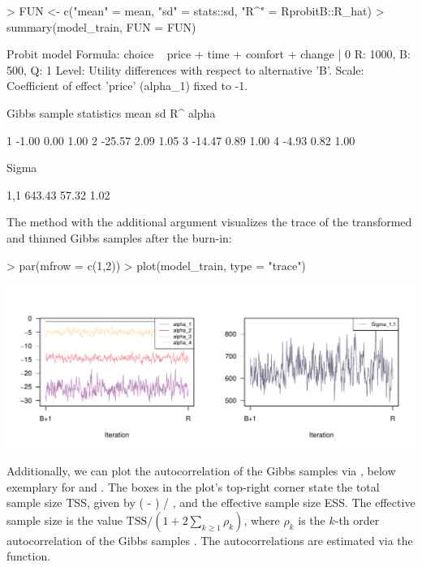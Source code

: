 \documentclass[article,shortnames]{jss}
\newcommand{\fct}[1]{\code{#1()}}
\begin{document}
\begin{Schunk}
\begin{Sinput}
> FUN <- c("mean" = mean, "sd" = stats::sd, "R^" = RprobitB::R_hat)
> summary(model_train, FUN = FUN)
\end{Sinput}
\begin{Soutput}
Probit model
Formula: choice ~ price + time + comfort + change | 0 
R: 1000, B: 500, Q: 1
Level: Utility differences with respect to alternative 'B'.
Scale: Coefficient of effect 'price' (alpha_1) fixed to -1.

Gibbs sample statistics
          mean      sd      R^
 alpha
                              
     1   -1.00    0.00    1.00
     2  -25.57    2.09    1.05
     3  -14.47    0.89    1.00
     4   -4.93    0.82    1.00

 Sigma
                              
   1,1  643.43   57.32    1.02
\end{Soutput}
\end{Schunk}

The \fct{plot} method with the additional argument  visualizes the trace of the transformed and thinned Gibbs samples after the burn-in:

\begin{Schunk}
\begin{Sinput}
> par(mfrow = c(1,2))
> plot(model_train, type = "trace")
\end{Sinput}
\end{Schunk}
\includegraphics{rprobitb_oelschlaeger_bauer-model-train-trace}

Additionally, we can plot the autocorrelation of the Gibbs samples via , below exemplary for  and . The boxes in the plot's top-right corner state the total sample size TSS, given by ( - ) / , and the effective sample size ESS. The effective sample size is the value $\text{TSS} / (1 + 2\sum_{k\geq 1} \rho_k)$, where $\rho_k$ is the $k$-th order autocorrelation of the Gibbs samples \citep{Marin:2014}. The autocorrelations are estimated via the \fct{stats::spec.ar} function.
\end{document}
